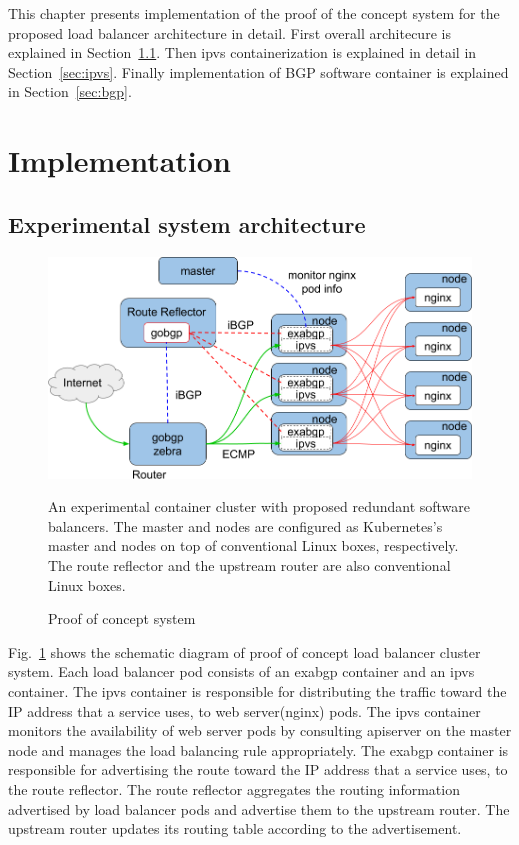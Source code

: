 This chapter presents implementation of the proof of the concept system for the proposed load balancer architecture in detail.
First overall architecure is explained in Section~\ref{sec:poc}.
Then ipvs containerization is explained in detail in Section~\ref{sec:ipvs}.
Finally implementation of BGP software container is explained in Section~\ref{sec:bgp}.

\section{Implementation}

\subsection{Experimental system architecture}\label{sec:poc}

\begin{figure}[tb]
\begin{center}
\includegraphics[width=0.8\columnwidth]{Figs/poc.png}
\end{center}
\caption{Proof of concept system}
\centering\parbox[c]{0.9\columnwidth}{
  An experimental container cluster with proposed redundant software balancers.
  The master and nodes are configured as Kubernetes's master and nodes on top of conventional Linux boxes, respectively.
  The route reflector and the upstream router are also conventional Linux boxes.
}
\label{fig:poc}
\end{figure}

Fig.~\ref{fig:poc} shows the schematic diagram of proof of concept load balancer cluster system.
%
Each load balancer pod consists of an exabgp container and an ipvs container.
The ipvs container is responsible for distributing the traffic toward the IP address that a service uses, to web server(nginx) pods.
The ipvs container monitors the availability of web server pods by consulting apiserver on the master node and manages the load balancing rule appropriately.
The exabgp container is responsible for advertising the route toward the IP address that a service uses, to the route reflector.
The route reflector aggregates the routing information advertised by load balancer pods and advertise them to the upstream router.
The upstream router updates its routing table according to the advertisement.

